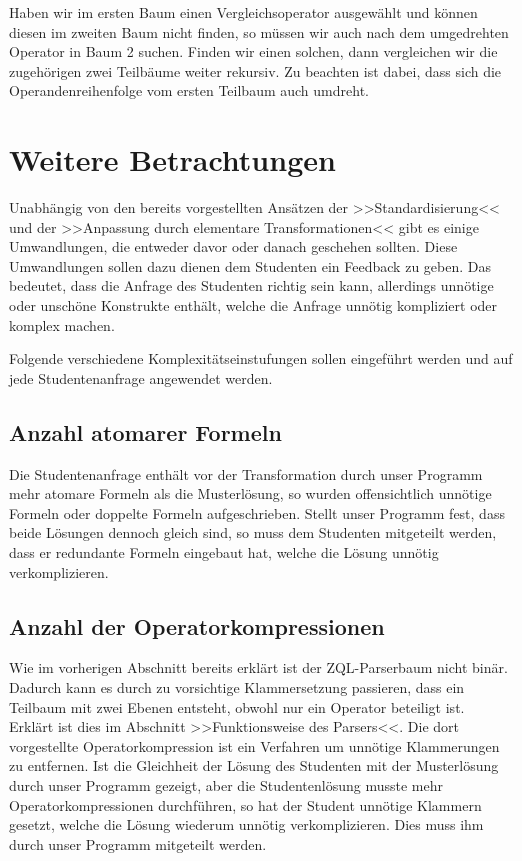 Haben wir im ersten Baum einen Vergleichsoperator ausgewählt und können diesen im zweiten Baum nicht finden, so müssen wir auch nach dem umgedrehten Operator in Baum 2 suchen. Finden wir einen solchen, dann vergleichen wir die zugehörigen zwei Teilbäume weiter rekursiv. Zu beachten ist dabei, dass sich die Operandenreihenfolge vom ersten Teilbaum auch umdreht.

\section{Weitere Betrachtungen}

Unabhängig von den bereits vorgestellten Ansätzen der >>Standardisierung<< und der >>Anpassung durch elementare Transformationen<< gibt es einige Umwandlungen, die entweder davor oder danach geschehen sollten. Diese Umwandlungen sollen dazu dienen dem Studenten ein Feedback zu geben. Das bedeutet, dass die Anfrage des Studenten richtig sein kann, allerdings unnötige oder unschöne Konstrukte enthält, welche die Anfrage unnötig kompliziert oder komplex machen.

Folgende verschiedene Komplexitätseinstufungen sollen eingeführt werden und auf jede Studentenanfrage angewendet werden.

\subsection{Anzahl atomarer Formeln}

Die Studentenanfrage enthält vor der Transformation durch unser Programm mehr atomare Formeln als die Musterlösung, so wurden offensichtlich unnötige Formeln oder doppelte Formeln aufgeschrieben. Stellt unser Programm fest, dass beide Lösungen dennoch gleich sind, so muss dem Studenten mitgeteilt werden, dass er redundante Formeln eingebaut hat, welche die Lösung unnötig verkomplizieren. 

\subsection{Anzahl der Operatorkompressionen}

Wie im vorherigen Abschnitt bereits erklärt ist der ZQL-Parserbaum nicht binär. Dadurch kann es durch zu vorsichtige Klammersetzung passieren, dass ein Teilbaum mit zwei Ebenen entsteht, obwohl nur ein Operator beteiligt ist. Erklärt ist dies im Abschnitt >>Funktionsweise des Parsers<<. Die dort vorgestellte Operatorkompression ist ein Verfahren um unnötige Klammerungen zu entfernen. Ist die Gleichheit der Lösung des Studenten mit der Musterlösung durch unser Programm gezeigt, aber die Studentenlösung musste mehr Operatorkompressionen durchführen, so hat der Student unnötige Klammern gesetzt, welche die Lösung wiederum unnötig verkomplizieren. Dies muss ihm durch unser Programm mitgeteilt werden.

